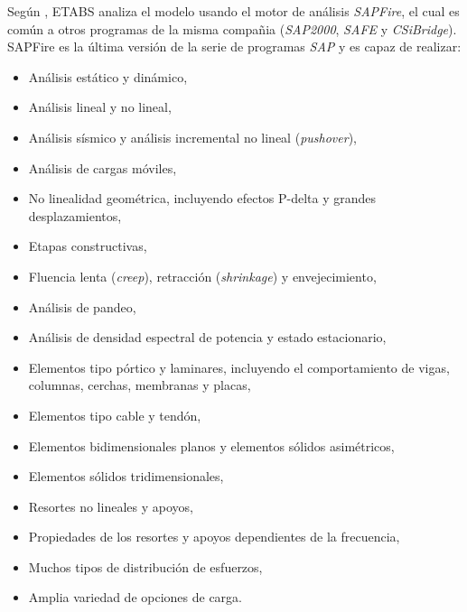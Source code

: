 Según \cite{ETABS2017analysisreferencemanual}, ETABS analiza el modelo usando el motor de análisis \emph{SAPFire}, el cual es común a otros programas de la misma compañia (\emph{SAP2000}, \emph{SAFE} y \emph{CSiBridge}). SAPFire es la última versión de la serie de programas \emph{SAP} y es capaz de realizar:
\begin{itemize}
    \item Análisis estático y dinámico,
    \item Análisis lineal y no lineal,
    \item Análisis sísmico y análisis incremental no lineal (\emph{pushover}),
    \item Análisis de cargas móviles,
    \item No linealidad geométrica, incluyendo efectos P-delta y grandes desplazamientos,
    \item Etapas constructivas,
    \item Fluencia lenta (\emph{creep}), retracción (\emph{shrinkage}) y envejecimiento,
    \item Análisis de pandeo,
    \item Análisis de densidad espectral de potencia y estado estacionario,
    \item Elementos tipo pórtico y laminares, incluyendo el comportamiento de vigas, columnas, cerchas, membranas y placas,
    \item Elementos tipo cable y tendón,
    \item Elementos bidimensionales planos y elementos sólidos asimétricos,
    \item Elementos sólidos tridimensionales,
    \item Resortes no lineales y apoyos,
    \item Propiedades de los resortes y apoyos dependientes de la frecuencia,
    \item Muchos tipos de distribución de esfuerzos,
    \item Amplia variedad de opciones de carga.
\end{itemize}



